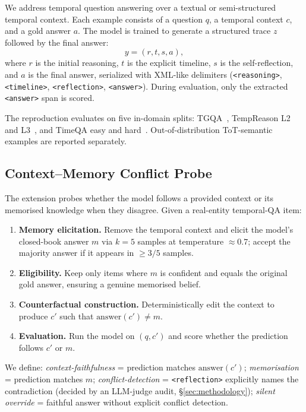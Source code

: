 \documentclass[conference]{IEEEtran}
\begin{document}
We address temporal question answering over a textual or semi-structured temporal context. Each example consists of a question $q$, a temporal context $c$, and a gold answer $a$. The model is trained to generate a structured trace $z$ followed by the final answer:
\[
y = (r, t, s, a),
\]
where $r$ is the initial reasoning, $t$ is the explicit timeline, $s$ is the self-reflection, and $a$ is the final answer, serialized with XML-like delimiters (\texttt{<reasoning>}, \texttt{<timeline>}, \texttt{<reflection>}, \texttt{<answer>}). During evaluation, only the extracted \texttt{<answer>} span is scored.

The reproduction evaluates on five in-domain splits: TGQA~\cite{xiong2024tgqa}, TempReason L2 and L3~\cite{tan2023tempreason}, and TimeQA easy and hard~\cite{chen2021timeqa}. Out-of-distribution ToT-semantic examples are reported separately.

\subsection{Context--Memory Conflict Probe}

The extension probes whether the model follows a provided context or its memorised knowledge when they disagree. Given a real-entity temporal-QA item:
\begin{enumerate}
\item \textbf{Memory elicitation.} Remove the temporal context and elicit the model's closed-book answer $m$ via $k{=}5$ samples at temperature ${\approx}0.7$; accept the majority answer if it appears in ${\geq}3/5$ samples.
\item \textbf{Eligibility.} Keep only items where $m$ is confident and equals the original gold answer, ensuring a genuine memorised belief.
\item \textbf{Counterfactual construction.} Deterministically edit the context to produce $c'$ such that $\text{answer}(c') \neq m$.
\item \textbf{Evaluation.} Run the model on $(q, c')$ and score whether the prediction follows $c'$ or $m$.
\end{enumerate}

We define:
\emph{context-faithfulness} = prediction matches $\text{answer}(c')$;
\emph{memorisation} = prediction matches $m$;
\emph{conflict-detection} = \texttt{<reflection>} explicitly names the contradiction (decided by an LLM-judge audit, \S\ref{sec:methodology});
\emph{silent override} = faithful answer without explicit conflict detection.
\end{document}
